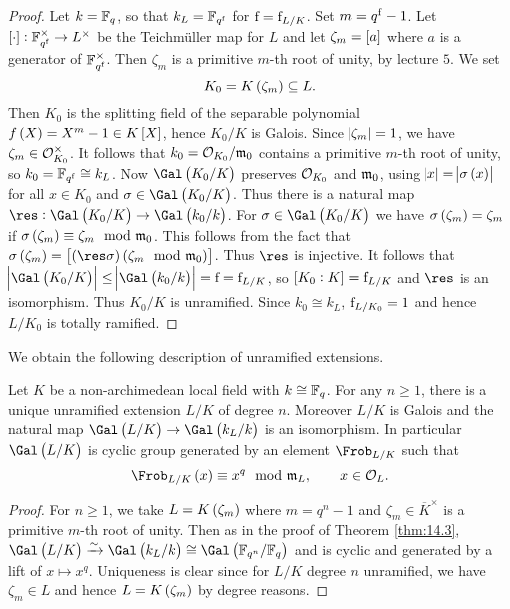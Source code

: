 \begin{proof}
Let $ k = \mathbb{F}_q $, so that $ k_L = \mathbb{F}_{q^{\mathrm{f}}} $ for $ \mathrm{f} = \mathrm{f}_{L / K} $. Set $ m = q^{\mathrm{f}} - 1 $. Let $ \sbr{\cdot} : \FF_{q^\f}^\times \to L^\times $ be the Teichm\"uller map for $ L $ and let $ \zeta_m = \sbr{a} $ where $ a $ is a generator of $ \mathbb{F}_{q^{\mathrm{f}}}^\times $. Then $ \zeta_m $ is a primitive $ m $-th root of unity, by lecture $ 5 $. We set
$$ K_0 = K\br{\zeta_m} \subseteq L. $$
Then $ K_0 $ is the splitting field of the separable polynomial $ f\br{X} = X^m - 1 \in K\sbr{X} $, hence $ K_0 / K $ is Galois. Since $ \abs{\zeta_m} = 1 $, we have $ \zeta_m \in \mathcal{O}_{K_0}^\times $. It follows that $ k_0 = \mathcal{O}_{K_0} / \mathfrak{m}_0 $ contains a primitive $ m $-th root of unity, so $ k_0 = \mathbb{F}_{q^{\mathrm{f}}} \cong k_L $. Now $ \Gal\br{K_0 / K} $ preserves $ \mathcal{O}_{K_0} $ and $ \mathfrak{m}_0 $, using $ \abs{x} = \abs{\sigma\br{x}} $ for all $ x \in K_0 $ and $ \sigma \in \Gal\br{K_0 / K} $. Thus there is a natural map $ \res : \Gal\br{K_0 / K} \to \Gal\br{k_0 / k} $. For $ \sigma \in \Gal\br{K_0 / K} $ we have $ \sigma\br{\zeta_m} = \zeta_m $ if $ \sigma\br{\zeta_m} \equiv \zeta_m \mod \mmm_0 $. This follows from the fact that $ \sigma\br{\zeta_m} = \sbr{\br{\res \sigma}\br{\zeta_m \mod \mmm_0}} $. Thus $ \res $ is injective. It follows that $ \abs{\Gal\br{K_0 / K}} \le \abs{\Gal\br{k_0 / k}} = \f = \f_{L / K} $, so $ \sbr{K_0 : K} = \f_{L / K} $ and $ \res $ is an isomorphism. Thus $ K_0 / K $ is unramified. Since $ k_0 \cong k_L $, $ \mathrm{f}_{L / K_0} = 1 $ and hence $ L / K_0 $ is totally ramified.
\end{proof}

We obtain the following description of unramified extensions.

\begin{theorem}
\label{thm:14.4}
Let $ K $ be a non-archimedean local field with $ k \cong \mathbb{F}_q $. For any $ n \ge 1 $, there is a unique unramified extension $ L / K $ of degree $ n $. Moreover $ L / K $ is Galois and the natural map $ \Gal\br{L / K} \to \Gal\br{k_L / k} $ is an isomorphism. In particular $ \Gal\br{L / K} $ is cyclic group generated by an element $ \Frob_{L / K} $ such that
$$ \Frob_{L / K}\br{x} \equiv x^q \mod \mmm_L, \qquad x \in \OOO_L. $$
\end{theorem}

\begin{proof}
For $ n \ge 1 $, we take $ L = K\br{\zeta_m} $ where $ m = q^n - 1 $ and $ \zeta_m \in \overline{K}^\times $ is a primitive $ m $-th root of unity. Then as in the proof of Theorem \ref{thm:14.3}, $ \Gal\br{L / K} \xrightarrow{\sim} \Gal\br{k_L / k} \cong \Gal\br{\FF_{q^n} / \FF_q} $ and is cyclic and generated by a lift of $ x \mapsto x^q $. Uniqueness is clear since for $ L / K $ degree $ n $ unramified, we have $ \zeta_m \in L $ and hence $ L = K\br{\zeta_m} $ by degree reasons.
\end{proof}

